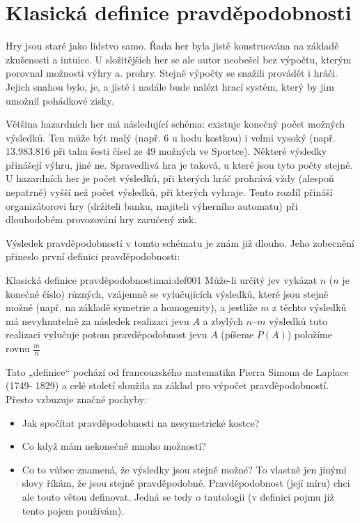     
  
  \section{Klasická definice pravděpodobnosti}
    Hry jsou staré jako lidstvo samo. Řada her byla jistě konstruována na základě zkušenosti a
    intuice. U složitějších her se ale autor neobešel bez výpočtu, kterým porovnal možnosti výhry a.
    prohry. Stejně výpočty se snažili provádět i hráči. Jejich snahou bylo, je, a jistě i nadále
    bude nalézt hrací systém, který by jim umožnil pohádkové zisky.
    
    Většina hazardních her má následující schéma: existuje konečný počet možných výsledků. Ten může
    být malý (např. 6 u hodu kostkou) i velmi vysoký (např. 13.983.816 při tahu šesti čísel ze 49
    možných ve Sportce). Některé výsledky přinášejí výhru, jiné ne. Spravedlivá hra je taková, u
    které jsou tyto počty stejné. U hazardních her je počet výsledků, při kterých hráč prohrává vždy
    (alespoň nepatrně) vyšší než počet výsledků, při kterých vyhraje. Tento rozdíl přináší
    organizátorovi hry (držiteli banku, majiteli výherního automatu) při dlouhodobém provozování hry
    zaručený zisk.
    
    Výsledek pravděpodobností v tomto schématu je znám již dlouho. Jeho zobecnění přineslo první
    deﬁnici pravděpodobnosti:
    \begin{mathdef}{Klasická definice pravděpodobnosti}{mai:def001}
      Může-li určitý jev vykázat \(n\) (\(n\) je konečné číslo) různých, vzájemně se vylučujících
      výsledků, které jsou stejně možné (např. na základě symetrie a homogenity), a jestliže \(m\) z
      těchto výsledků má nevyhnutelně za následek realizaci jevu \(A\) a zbylých \(n – m\) výsledků
      tuto realizaci vylučuje potom pravděpodobnost jevu \(A\) (píšeme \(P(A)\)) položíme rovnu
      \(\frac{m}{n}\)
    \end{mathdef}

    Tato „deﬁnice“ pochází od francouzského matematika Pierra Simona de Laplace (1749- 1829) a celé
    století sloužila za základ pro výpočet pravděpodobností. Přesto vzbuzuje značné pochyby:

    \begin{itemize}[noitemsep]
      \item Jak spočítat pravděpodobnosti na nesymetrické kostce?
      \item Co když mám nekonečně mnoho možností? 
      \item Co to vůbec znamená, že výsledky jsou stejně možné? To vlastně jen jinými slovy říkám,
            že jsou stejně pravděpodobné. Pravděpodobnost (její míru) chci ale touto větou deﬁnovat.
            Jedná se tedy o tautologii (v deﬁnici pojmu již tento pojem používám).
    \end{itemize}
    
